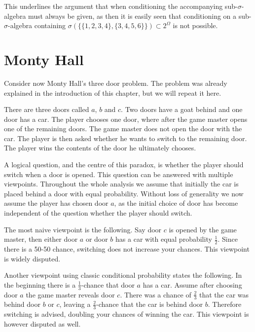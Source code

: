 \documentclass[a4paper]{report}
\theoremstyle{plain}
\theoremstyle{definition}
\theoremstyle{remark}
\numberwithin{equation}{chapter}
\DeclareMathOperator{\1}{\mathbbm{1}}
\begin{document}
This underlines the argument that when conditioning the accompanying sub-$\sigma$-algebra must always be given, as then it is easily seen that conditioning on a sub-$\sigma$-algebra containing $\sigma(\{\{1,2,3,4\},\{3,4,5,6\}\})\subset2^\Omega$ is not possible.

\section{Monty Hall}\label{sec:DiscMonty}
Consider now Monty Hall's three door problem. The problem was already explained in the introduction of this chapter, but we will repeat it here.

There are three doors called $a$, $b$ and $c$.  Two doors have a goat behind and one door has a car. The player chooses one door, where after the game master opens one of the remaining doors. The game master does not open the door with the car. The player is then asked whether he wants to switch to the remaining door. The player wins the contents of the door he ultimately chooses.

A logical question, and the centre of this paradox, is whether the player should switch when a door is opened. This question can be answered with multiple viewpoints. Throughout the whole analysis we assume that initially the car is placed behind a door with equal probability. Without loss of generality we now assume the player has chosen door $a$, as the initial choice of door has become independent of the question whether the player should switch.

The most naive viewpoint is the following. Say door $c$ is opened by the game master, then either door $a$ or door $b$ has a car with equal probability $\frac{1}{2}$. Since there is a 50-50 chance, switching does not increase your chances. This viewpoint is widely disputed.

Another viewpoint using classic conditional probability states the following. In the beginning there is a $\frac{1}{3}$-chance that door $a$ has a car. Assume after choosing door $a$ the game master reveals door $c$. There was a chance of $\frac{2}{3}$ that the car was behind door $b$ or $c$, leaving a $\frac{2}{3}$-chance that the car is behind door $b$. Therefore switching is advised, doubling your chances of winning the car. This viewpoint is however disputed as well.
\end{document}
